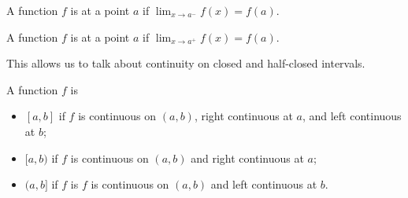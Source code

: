 \documentclass{ximera}
\begin{document}
\begin{definition}
  A function $f$ is  at a point $a$ if
  $\lim_{x\to a^-} f(x) = f(a)$.

  A function $f$ is  at a point $a$ if
  $\lim_{x\to a^+} f(x) = f(a)$.
\end{definition}

 This allows us to talk about continuity on closed and half-closed intervals.


\begin{definition}
  A function $f$ is
  \begin{itemize}
    \item {} $[a,b]$ if $f$ is
      continuous on $(a,b)$, right continuous at $a$, and left
      continuous at $b$;
    \item {} $[a,b)$ if $f$ is
      continuous on $(a,b)$ and right continuous at $a$;
    \item {} $(a,b]$ if $f$ is
      $f$ is continuous on $(a,b)$ and left continuous at $b$.
  \end{itemize}
\end{definition}
\end{document}
